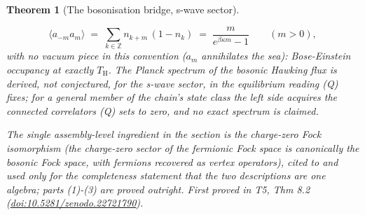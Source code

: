 \documentclass[11pt]{article}
\newtheorem{theorem}{Theorem}[section]
\theoremstyle{definition}
\theoremstyle{plain}
\providecommand{\TH}{}\renewcommand{\TH}{T_{\mathrm{H}}}
\begin{document}
\begin{theorem}[The bosonisation bridge, s-wave sector]
\begin{enumerate}
\[
\langle a_{-m} a_m \rangle \;=\; \sum_{k \in \mathbb{Z}} n_{k+m}\,(1 - n_k) \;=\; \frac{m}{e^{\beta\kappa m} - 1} \qquad (m > 0) ,
\]
with no vacuum piece in this convention ($a_m$ annihilates the sea): Bose-Einstein occupancy at exactly $\TH$. The Planck spectrum of the bosonic Hawking flux is derived, not conjectured, for the s-wave sector, in the equilibrium reading (Q) fixes; for a general member of the chain's state class the left side acquires the connected correlators (Q) sets to zero, and no exact spectrum is claimed.
\end{enumerate}
The single assembly-level ingredient in the section is the charge-zero Fock isomorphism (the charge-zero sector of the fermionic Fock space is canonically the bosonic Fock space, with fermions recovered as vertex operators), cited to \cite{PressleySegal1986} and used only for the completeness statement that the two descriptions are one algebra; parts (1)-(3) are proved outright.
\emph{First proved in} T5, Thm 8.2 (\href{https://doi.org/10.5281/zenodo.22721790}{doi:10.5281/zenodo.22721790}).
\end{theorem}
\end{document}

